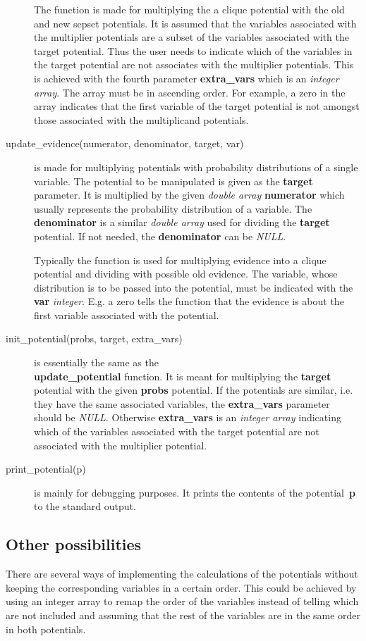 \documentclass[12pt,a4paper]{report}
\begin{document}
\begin{description}
The function is made for multiplying the a clique potential with the 
old and new sepset potentials. It is assumed that the variables
associated with the multiplier potentials are a subset of the
variables associated with the target potential. Thus the user needs to
indicate which of the variables in the target potential are not
associates with the multiplier potentials. This is achieved with the
fourth parameter \textbf{extra\_vars} which is an {\it integer array}. 
The array must be in ascending order. For example, a zero in the array 
indicates that the first variable of the target potential is not
amongst those associated with the multiplicand potentials.
\item[update\_evidence(numerator, denominator, target, var)] is made
for multiplying potentials with probability distributions of a single
variable. The potential to be manipulated is given as the
\textbf{target} parameter. It is multiplied by the given {\it double
array} \textbf{numerator} which usually represents the probability
distribution of a variable. The \textbf{denominator} is a similar 
{\it double array} used for dividing the \textbf{target} potential. 
If not needed, the \textbf{denominator} can be {\it NULL}.

Typically the function is used for multiplying evidence into a clique 
potential and dividing with possible old evidence. The variable, whose 
distribution is to be passed into the potential, must be indicated 
with the \textbf{var} {\it integer}. E.g. a zero tells the function 
that the evidence is about the first variable associated with the potential.
\item[init\_potential(probs, target, extra\_vars)] is essentially the
same as the \\ \textbf{update\_potential} function. It is meant for
multiplying the \textbf{target} potential with the given
\textbf{probs} potential. If the potentials are similar, i.e. they
have the same associated variables, the \textbf{extra\_vars} parameter 
should be {\it NULL}. Otherwise \textbf{extra\_vars} is an 
{\it integer array} indicating which of the variables associated with
the target potential are not associated with the multiplier potential.
\item[print\_potential(p)] is mainly for debugging purposes. It prints 
the contents of the potential~\textbf{p} to the standard output.
\end{description}


\subsection{Other possibilities}
There are several ways of implementing the calculations of the potentials
without keeping the corresponding variables in a certain order. This
could be achieved by using an integer array to remap the order of the
variables instead of telling which are not included and assuming that
the rest of the variables are in the same order in both potentials.
\end{document}

